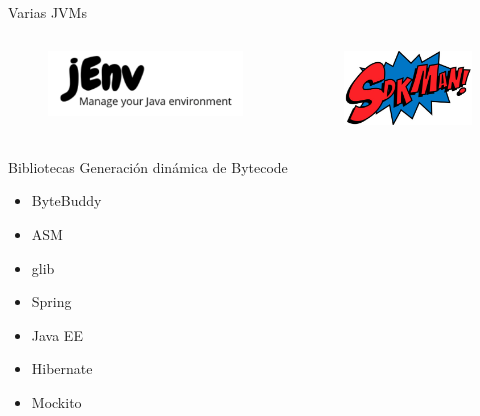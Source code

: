 \documentclass[aspectratio=169]{beamer}
\begin{document}
\begin{frame}[fragile]{Varias JVMs}
\begin{columns}[T] %
    
    \begin{column}[T]{5cm} %
        \begin{figure}
            \centering
            \includegraphics[width=\linewidth]{Images/jenv}
        \end{figure}
    \end{column}
    \begin{column}[T]{6cm} %
        \begin{figure}
            \centering
            \includegraphics[width=\linewidth]{Images/sdkman}
        \end{figure}
    \end{column}
\end{columns}
\end{frame}

\begin{frame}[fragile]{Bibliotecas}
    Generación dinámica de Bytecode
    \begin{itemize}
        \item ByteBuddy
        \item ASM
        \item glib
        \item Spring
        \item Java EE
        \item Hibernate
        \item Mockito
    \end{itemize}
\end{frame}
\end{document}
